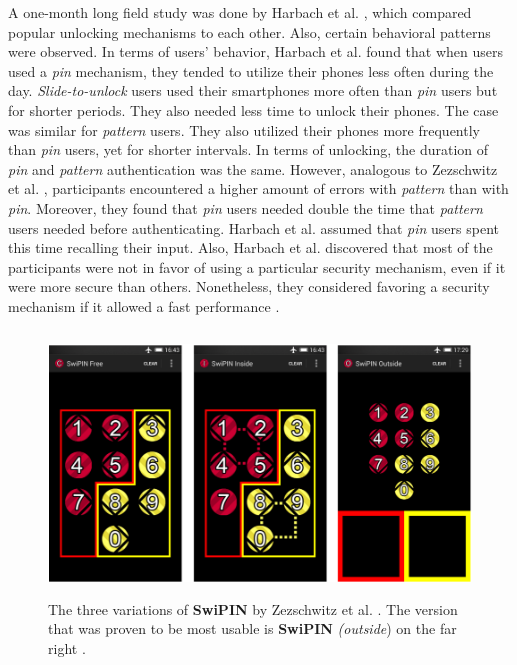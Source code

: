 A one-month long field study was done by Harbach et al. \cite{AnatomySmartphone}, which compared popular unlocking mechanisms to each other. Also, certain behavioral patterns were observed. In terms of users' behavior, Harbach et al. \cite{AnatomySmartphone} found that when users used a \textit{pin} mechanism, they tended to utilize their phones less often during the day. \textit{Slide-to-unlock} users used their smartphones more often than \textit{pin} users but for shorter periods. They also needed less time to unlock their phones. The case was similar for \textit{pattern} users. They also utilized their phones more frequently than \textit{pin} users, yet for shorter intervals. In terms of unlocking, the duration of \textit{pin} and \textit{pattern} authentication was the same. However, analogous to Zezschwitz et al. \cite{PatternWild}, participants encountered a higher amount of errors with \textit{pattern} than with \textit{pin}.
Moreover, they found that \textit{pin} users needed double the time that \textit{pattern} users needed before authenticating. Harbach et al. \cite{AnatomySmartphone} assumed that \textit{pin} users spent this time recalling their input. Also, Harbach et al. \cite{AnatomySmartphone} discovered that most of the participants were not in favor of using a particular security mechanism, even if it were more secure than others. Nonetheless, they considered favoring a security mechanism if it allowed a fast performance \cite{AnatomySmartphone,Albayram:2017:BUL:3235924.3235929}.

\begin{figure}[t!]
\centering
\includegraphics[width=13cm, height=7cm]{Chapters/graphics/swipin.PNG}
\caption{The three variations of \textbf{SwiPIN} by Zezschwitz et al. \cite{Swipin}. The version that was proven to be most usable is \textbf{SwiPIN} \textit{(outside}) on the far right \cite{Swipin}. }
\label{fig:swipin}
\end{figure}


